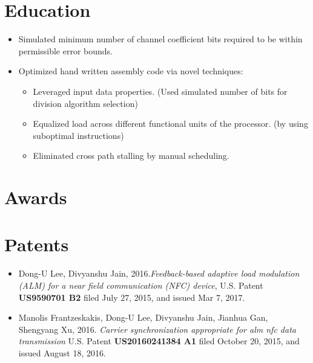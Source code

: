 \documentclass[11pt,a4paper]{moderncv}
\begin{document}
\section{Education}

\begin{itemize}%
\item Simulated minimum number of channel coefficient bits required to be within permissible error bounds.
\item Optimized hand written assembly code via novel techniques:
	\begin{itemize}%
	\item Leveraged input data properties. (Used simulated number of bits for division algorithm selection)
	\item Equalized load across different functional units of the processor. (by using suboptimal instructions)
	\item Eliminated cross path stalling by manual scheduling.
	\end{itemize}
\end{itemize}



\section{Awards}

\section{Patents}
\begin{itemize}%
\item Dong-U Lee, Divyanshu Jain,  2016.{\emph{Feedback-based adaptive load modulation (ALM) for a near field communication (NFC) device}}, U.S. Patent \textbf{US9590701 B2} filed July 27, 2015, and issued Mar 7, 2017.
\item Manolis Frantzeskakis, Dong-U Lee, Divyanshu Jain, Jianhua Gan, Shengyang Xu, 2016. {\emph{Carrier synchronization appropriate for alm nfc data transmission}} U.S. Patent \textbf{US20160241384 A1} filed October 20, 2015, and issued August 18, 2016.
\end{itemize}
\end{document}
